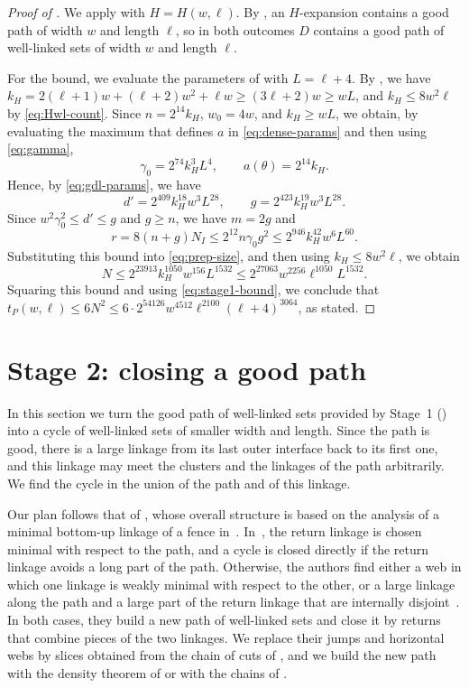 \documentclass[fontsize=12pt,leading=14pt]{fullpaper}
\newcommand{\Hwl}{H(w,\ell)}
\begin{document}
\begin{proof}[Proof of ]
  We apply  with $H=\Hwl$.
  By , an $H$-expansion contains a good path of width $w$ and length $\ell$, so in both outcomes $D$ contains a good path of well-linked sets of width $w$ and length $\ell$.

  For the bound, we evaluate the parameters of  with $L=\ell+4$.
  By , we have $k_H=2(\ell+1)w+(\ell+2)w^2+\ell w\ge(3\ell+2)w\ge wL$, and $k_H\le8w^2\ell$ by \eqref{eq:Hwl-count}.
  Since $n=2^{14}k_H$, $w_0=4w$, and $k_H\ge wL$, we obtain, by evaluating the maximum that defines $a$ in \eqref{eq:dense-params} and then using \eqref{eq:gamma},
  \[
    \gamma_0=2^{74}k_H^3L^4,\qquad
    a(\theta)=2^{14}k_H.
  \]
  Hence, by \eqref{eq:gdl-params}, we have
  \[
    d'=2^{409}k_H^{18}w^3L^{28},\qquad
    g=2^{423}k_H^{19}w^3L^{28}.
  \]
  Since $w^2\gamma_0^2\le d'\le g$ and $g\ge n$, we have $m=2g$ and
  \[
    r=8(n+g)N_I\le2^{12}n\gamma_0g^2
    \le2^{946}k_H^{42}w^6L^{60}.
  \]
  Substituting this bound into \eqref{eq:prep-size}, and then using $k_H\le8w^2\ell$, we obtain
  \[
    N\le2^{23913}k_H^{1050}w^{156}L^{1532}
    \le2^{27063}w^{2256}\ell^{1050}L^{1532}.
  \]
  Squaring this bound and using \eqref{eq:stage1-bound}, we conclude that $t_P(w,\ell)\le6N^2\le6\cdot2^{54126}w^{4512}\ell^{2100}(\ell+4)^{3064}$, as stated.
\end{proof}

%
\section{Stage 2: closing a good path}\label{sec:stage2}

In this section we turn the good path of well-linked sets provided by Stage~1 () into a cycle of well-linked sets of smaller width and length.
Since the path is good, there is a large linkage from its last outer interface back to its first one, and this linkage may meet the clusters and the linkages of the path arbitrarily.
We find the cycle in the union of the path and of this linkage.

Our plan follows that of \textcite[sections~4 and~5]{HKMM26b}, whose overall structure is based on the analysis of a minimal bottom-up linkage of a fence in~\cite[Section~6]{KawarabayashiK15}.
In~\cite{HKMM26b}, the return linkage is chosen minimal with respect to the path, and a cycle is closed directly if the return linkage avoids a long part of the path.
Otherwise, the authors find either a web in which one linkage is weakly minimal with respect to the other, or a large linkage along the path and a large part of the return linkage that are internally disjoint~\cite[Lemma~4.13]{HKMM26b}.
In both cases, they build a new path of well-linked sets and close it by returns that combine pieces of the two linkages.
We replace their jumps and horizontal webs by slices obtained from the chain of cuts of , and we build the new path with the density theorem of  or with the chains of .
\end{document}
